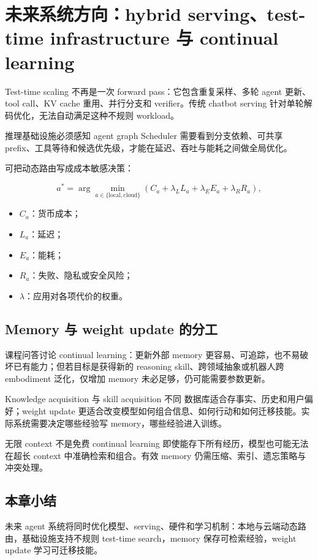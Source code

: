 \section{未来系统方向：hybrid serving、test-time infrastructure 与 continual learning}


Test-time scaling 不再是一次 forward pass：它包含重复采样、多轮 agent 更新、tool call、KV cache 重用、并行分支和 verifier。传统 chatbot serving 针对单轮解码优化，无法自动满足这种不规则 workload。

\begin{importantbox}{推理基础设施必须感知 agent graph}
Scheduler 需要看到分支依赖、可共享 prefix、工具等待和候选优先级，才能在延迟、吞吐与能耗之间做全局优化。
\end{importantbox}


可把动态路由写成成本敏感决策：

$$
a^*=\arg\min_{a\in\{\text{local},\text{cloud}\}}
\left(C_a+\lambda_L L_a+\lambda_E E_a+\lambda_R R_a\right),
$$

\begin{itemize}
    \item $C_a$：货币成本；
    \item $L_a$：延迟；
    \item $E_a$：能耗；
    \item $R_a$：失败、隐私或安全风险；
    \item $\lambda$：应用对各项代价的权重。
\end{itemize}

\subsection{Memory 与 weight update 的分工}

课程问答讨论 continual learning：更新外部 memory 更容易、可追踪，也不易破坏已有能力；但若目标是获得新的 reasoning skill、跨领域抽象或机器人跨 embodiment 泛化，仅增加 memory 未必足够，仍可能需要参数更新。

\begin{knowledgebox}{Knowledge acquisition 与 skill acquisition 不同}
数据库适合存事实、历史和用户偏好；weight update 更适合改变模型如何组合信息、如何行动和如何迁移技能。实际系统需要决定哪些经验写 memory，哪些经验进入训练。
\end{knowledgebox}

\begin{warningbox}{无限 context 不是免费 continual learning}
即使能存下所有经历，模型也可能无法在超长 context 中准确检索和组合。有效 memory 仍需压缩、索引、遗忘策略与冲突处理。
\end{warningbox}

\subsection{本章小结}

未来 agent 系统将同时优化模型、serving、硬件和学习机制：本地与云端动态路由，基础设施支持不规则 test-time search，memory 保存可检索经验，weight update 学习可迁移技能。

